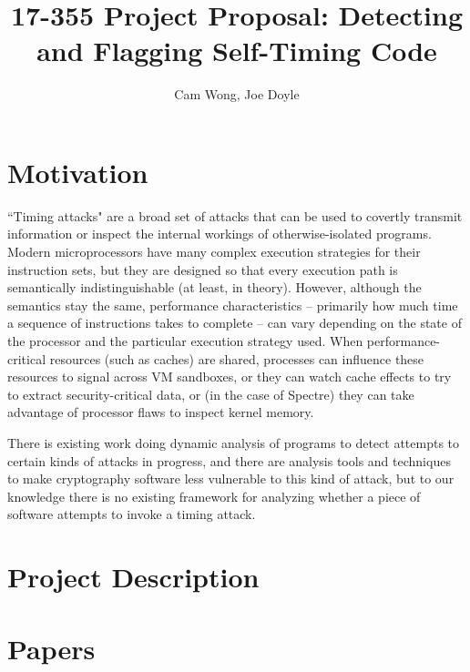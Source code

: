 \documentclass[twocolumn]{article}
\title{17-355 Project Proposal: Detecting and Flagging Self-Timing
Code}
\author{Cam Wong, Joe Doyle}
\begin{document}
\maketitle

\section{Motivation}

``Timing attacks" are a broad set of attacks that can be used to
covertly transmit information or inspect the internal workings of
otherwise-isolated programs. Modern microprocessors have many complex
execution strategies for their instruction sets, but they are designed
so that every execution path is semantically indistinguishable (at
least, in theory). However, although the semantics stay the same,
performance characteristics -- primarily how much time a sequence of
instructions takes to complete -- can vary depending on the state of
the processor and the particular execution strategy used. When
performance-critical resources (such as caches) are shared, processes
can influence these resources to signal across VM sandboxes, or they
can watch cache effects to try to extract security-critical data, or
(in the case of Spectre) they can take advantage of processor flaws to
inspect kernel memory.

There is existing work doing dynamic analysis of programs to detect
attempts to certain kinds of attacks in progress, and there are
analysis tools and techniques to make cryptography software less
vulnerable to this kind of attack, but to our knowledge there is no
existing framework for analyzing whether a piece of software attempts
to invoke a timing attack.

\section{Project Description}


\section{Papers}
\end{document}
